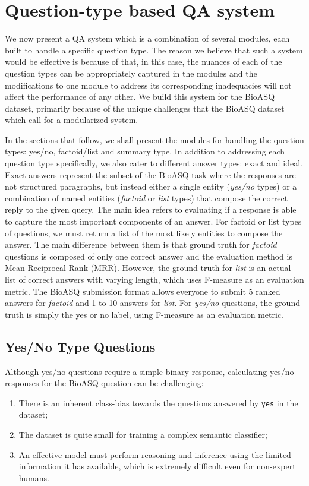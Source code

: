 \section{Question-type based QA system} \label{approach2}

We now present a QA system which is a combination of several modules, each built to handle a specific question type. The reason we believe that such a system would be effective is because of that, in this case, the nuances of each of the question types can be appropriately captured in the modules and the modifications to one module to address its corresponding inadequacies will not affect the performance of any other. 
We build this system for the BioASQ dataset, primarily because of the unique challenges that the BioASQ dataset which call for a modularized system. 

In the sections that follow, we shall present the modules for handling the question types: yes/no, factoid/list and summary type. In addition to addressing each question type specifically, we also cater to different answer types: exact and ideal. Exact answers represent the subset of the BioASQ task where the responses are not structured paragraphs, but instead either a single entity (\textit{yes/no} types) or a combination of named entities (\textit{factoid} or \textit{list} types) that compose the correct reply to the given query. The main idea refers to evaluating if a response is able to capture the most important components of an answer. For factoid or list types of questions, we must return a list of the most likely entities to compose the answer. The main difference between them is that ground truth for \textit{factoid} questions is composed of only one correct answer and the evaluation method is Mean Reciprocal Rank (MRR). However, the ground truth for \textit{list} is an actual list of correct answers with varying length, which uses F-measure as an evaluation metric. The BioASQ submission format allows everyone to submit 5 ranked answers for \textit{factoid} and 1 to 10 answers for \textit{list}. For \textit{yes/no} questions, the ground truth is simply the yes or no label, using F-measure as an evaluation metric.

\subsection{Yes/No Type Questions}

Although yes/no questions require a simple binary response, calculating yes/no responses for the BioASQ question can be challenging: 
\begin{enumerate}
    \item There is an inherent class-bias towards the questions answered by \texttt{yes} in the dataset;
    \item The dataset is quite small for training a complex semantic classifier;
    \item An effective model must perform  reasoning and inference using the limited information it has available, which is extremely difficult even for non-expert humans.
\end{enumerate}


